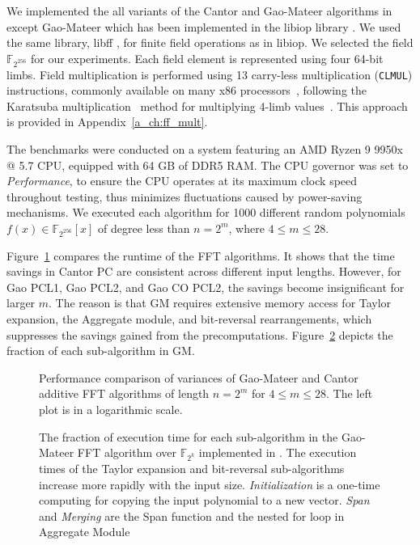 We implemented the all variants of the Cantor and Gao-Mateer algorithms in \CC except Gao-Mateer which has been implemented in the libiop library \cite{libiop}. We used the same library, libff \cite{libff}, for finite field operations as in libiop. We selected the field $\mathbb{F}_{2^{256}}$ for our experiments. Each field element is represented using four 64-bit limbs. Field multiplication is performed using 13 carry-less multiplication (\texttt{CLMUL}) instructions, commonly available on many x86 processors~\cite{gueron2010intel}, following the Karatsuba multiplication~\cite{karatsuba1962multiplication} method for multiplying 4-limb values~\cite{libiop}. This approach is provided in Appendix~\ref{a_ch:ff_mult}.

The benchmarks were conducted on a system featuring an AMD Ryzen 9 9950x @ 5.7 CPU, equipped with 64 GB of DDR5 RAM. The CPU governor was set to \textit{Performance}, to ensure the CPU operates at its maximum clock speed throughout testing, thus minimizes fluctuations caused by power-saving mechanisms.
We executed each algorithm for 1000 different random polynomials \( f(x) \in \mathbb{F}_{2^{256}}[x] \) of degree less than \( n = 2^m \), where \( 4 \leq m \leq 28 \).

Figure~\ref{fig:benchmark} compares the runtime of the FFT algorithms. It shows that the time savings in Cantor PC are consistent across different input lengths. However, for Gao PCL1, Gao PCL2, and Gao CO PCL2, the savings become insignificant for larger $m$. The reason is that GM requires extensive memory access for Taylor expansion, the \textsf{Aggregate} module, and bit-reversal rearrangements, which suppresses the savings gained from the precomputations.  Figure~\ref{fig:sub_parts_normalized} depicts the fraction of each sub-algorithm in GM.

\begin{figure}
	\centering
	\resizebox{\textwidth}{!}{
		
	}
	\caption{Performance comparison of variances of Gao-Mateer and Cantor additive FFT algorithms of length $n=2^m$ for $4\leq m \leq 28$. The left plot is in a logarithmic scale. }
	\label{fig:benchmark}
\end{figure}

\begin{figure}[ht!]
	\centering
	\resizebox{.9\textwidth}{!}{
		
	}
	\caption[The fraction of execution time for each sub-algorithm in the Gao-Mateer FFT algorithm]{The fraction of execution time for each sub-algorithm in the Gao-Mateer FFT algorithm over $\mathbb{F}_{2^k}$ implemented in \cite{libiop}. The execution times of the Taylor expansion and bit-reversal sub-algorithms increase more rapidly with the input size.  \textit{Initialization} is a one-time computing for copying the input polynomial to a new vector. \textit{Span} and \textit{Merging} are the \textsf{Span} function and the nested for loop in \textsf{Aggregate} Module}
	\label{fig:sub_parts_normalized}
\end{figure}

